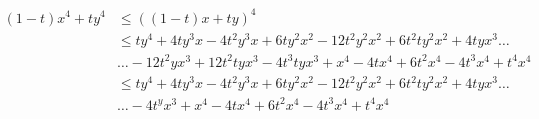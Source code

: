 \documentclass{article}
\begin{document}
\begin{align*}
	(1-t)x^4 + ty^4 &\leq \left((1-t)x + ty\right)^4\\
	&\leq ty^4 + 4 ty^3 x - 4t^2y^3 x + 6 ty^2 x^2 -12 t^2y^2 x^2 + 6 t^2 ty^2 x^2 + 4 ty x^3 \dots\\
	&\dots- 12 t^2y x^3 + 12 t^2 ty x^3 - 4 t^3 ty x^3 + x^4 - 4 t x^4 + 6 t^2 x^4 - 4 t^3 x^4 + t^4 x^4\\
	&\leq ty^4 + 4 ty^3 x - 4t^2y^3 x + 6 ty^2 x^2 -12 t^2y^2 x^2 + 6 t^2 ty^2 x^2 + 4 ty x^3 \dots\\
	&\dots - 4 t^y x^3 + x^4 - 4 t x^4 + 6 t^2 x^4 - 4 t^3 x^4 + t^4 x^4\\
\end{align*}
\end{document}
